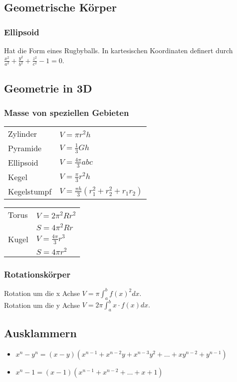 \subsection{Geometrische Körper}
\subsubsection{Ellipsoid}
Hat die Form eines Rugbyballs. In kartesischen Koordinaten definert durch
$\frac{x^2}{a^2} + \frac{y^2}{b^2} + \frac{z^2}{c^2} - 1 = 0$.

\subsection{Geometrie in 3D}
\subsubsection*{Masse von speziellen Gebieten}
	\begin{multicols}{2}
	\renewcommand\arraystretch{1.4}
	\begin{tabular}{l|l}
		Zylinder   &   $ V = \pi r^2 h $ \\
		Pyramide   &   $ V = \frac{1}{3} G h $ \\
		Ellipsoid   &   $ V = \frac{4 \pi}{3} a b c $ \\
		Kegel   &   $ V = \frac{\pi}{3} r^2 h $ \\
		Kegelstumpf   &   $ V = \frac{\pi h}{3} (r_1^2+r_2^2 + r_1 r_2) $ 
	\end{tabular}
	
	\columnbreak
	\begin{tabular}{l|l}
		Torus   &   $ V = 2 \pi^2 R r^2 $ \\
		   &   $ S = 4 \pi^2 R r $ \\
		Kugel   &   $ V = \frac{4 \pi}{3} r^3 $ \\
		   &   $ S = 4 \pi r^2 $ 
	\end{tabular}
	\end{multicols}

 \subsubsection*{Rotationskörper}
 Rotation um die x Achse $V=\pi \int_a^b f(x)^2 dx.$\\
 Rotation um die y Achse $V=2\pi \int_a^b x \cdot f(x) dx.$



\subsection{Ausklammern}
\begin{itemize}[leftmargin=*]
	\item $x^n - y^n = (x-y) (x^{n-1} + x^{n-2}y + x^{n-3}y^2 + \ldots + xy^{n-2}
	+ y^{n-1})$
	\item $x^n - 1 = (x-1)(x^{n-1} + x^{n-2} + \ldots + x + 1)$
\end{itemize}

